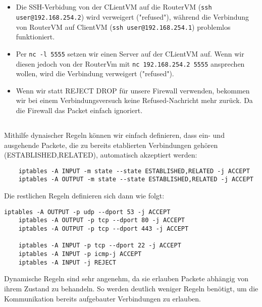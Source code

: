 \documentclass{scrartcl}
\begin{document}
    \subsection{}
    \label{sub:2.3}
    \begin{itemize}
      \item
      Die SSH-Verbidung von der CLientVM auf die RouterVM
      (\texttt{ssh user@192.168.254.2}) wird verweigert ("refused"),
      während die Verbindung von RouterVM auf ClientVM
      (\texttt{ssh user@192.168.254.1}) problemlos funktioniert.
      \item
      Per \texttt{nc -l 5555} setzen wir einen Server auf der CLientVM
      auf. Wenn wir diesen jedoch von der RouterVm mit
      \texttt{nc 192.168.254.2 5555} ansprechen wollen, wird die
      Verbindung verweigert ("refused").
      \item
      Wenn wir statt REJECT DROP für unsere Firewall verwenden,
      bekommen wir bei einem Verbindungsversuch keine Refused-Nachricht
      mehr zurück. Da die Firewall das Packet einfach ignoriert.
    \end{itemize}

  \subsection{}
  \label{sub:2.4}
  Mithilfe dynaischer Regeln können wir einfach definieren, dass ein- und
  ausgehende Packete, die zu bereits etablierten Verbindungen gehören
  (ESTABLISHED,RELATED), automatisch akzeptiert werden:
  \begin{lstlisting}
    iptables -A INPUT -m state --state ESTABLISHED,RELATED -j ACCEPT
    iptables -A OUTPUT -m state --state ESTABLISHED,RELATED -j ACCEPT
  \end{lstlisting}
  Die restlichen Regeln definieren sich dann wie folgt:
  \begin{lstlisting}[]
    iptables -A OUTPUT -p udp --dport 53 -j ACCEPT
    iptables -A OUTPUT -p tcp --dport 80 -j ACCEPT
    iptables -A OUTPUT -p tcp --dport 443 -j ACCEPT

    iptables -A INPUT -p tcp --dport 22 -j ACCEPT
    iptables -A INPUT -p icmp-j ACCEPT
    iptables -A INPUT -j REJECT
  \end{lstlisting}
  Dynamische Regeln sind sehr angenehm, da sie erlauben Packete abhängig
  von ihrem Zustand zu behandeln. So werden deutlich weniger Regeln benötigt,
  um die Kommunikation bereits aufgebauter Verbindungen zu erlauben.
\end{document}
